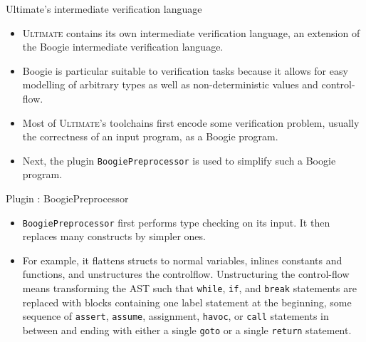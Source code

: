 \documentclass[12pt]{beamer}
\newcommand{\code}[1]{\texttt{#1}}
\newcommand{\ultimate}{\textsc{Ultimate }}
\newcommand{\ultimates}{\textsc{Ultimate}'s }
\begin{document}
\begin{frame}{Ultimate's intermediate verification language}
	\begin{itemize}
		\item \ultimate contains its own intermediate verification language, an extension of the Boogie intermediate verification language.
		\item  Boogie is particular suitable to verification tasks because it allows for easy modelling of arbitrary types as well as non-deterministic values and control-flow. 
		\item Most of \ultimates toolchains first encode some verification problem, usually the correctness of an input program, as a Boogie program.
		\item Next, the plugin \code{BoogiePreprocessor} is used to simplify such a Boogie program.
	\end{itemize}
\end{frame}

\begin{frame}{Plugin : BoogiePreprocessor}
	\begin{itemize}
		\item \code{BoogiePreprocessor} first performs type checking on its input. It then replaces many constructs by simpler ones.
		\item For example, it flattens structs to normal variables, inlines constants and functions, and unstructures the controlflow. Unstructuring the control-flow means transforming the AST such that \code{while}, \code{if}, and \code{break} statements are replaced with blocks containing one label statement at the beginning, some sequence of \code{assert}, \code{assume}, assignment, \code{havoc}, or \code{call} statements in between and ending with either a single \code{goto} or a single \code{return} statement.
	\end{itemize}
\end{frame}
\end{document}
